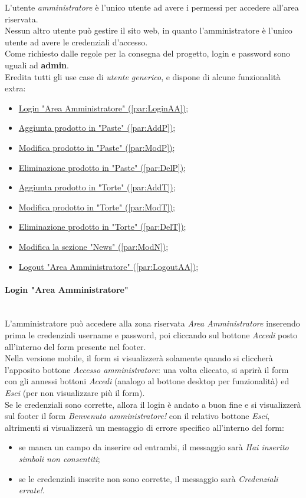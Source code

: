 L'utente \emph{amministratore} è l'unico utente ad avere i permessi per accedere all'area riservata.\\ 
Nessun altro utente può gestire il sito web, in quanto l'amministratore è l'unico utente ad avere le credenziali d'accesso.\\  
Come richiesto dalle regole per la consegna del progetto, login e password sono uguali ad \textbf{admin}.\\ 
Eredita tutti gli use case di \textit{utente generico}, e dispone di alcune funzionalità extra:
\begin{itemize}
	\item \hyperref[par:LoginAA]{ Login "Area Amministratore" (\ref{par:LoginAA})};
	\item \hyperref[par:AddP]{ Aggiunta prodotto in "Paste" (\ref{par:AddP})};
	\item \hyperref[par:ModP]{ Modifica prodotto in "Paste" (\ref{par:ModP})};
	\item \hyperref[par:DelP]{ Eliminazione prodotto in "Paste" (\ref{par:DelP})};
	\item \hyperref[par:AddT]{ Aggiunta prodotto in "Torte" (\ref{par:AddT})};
	\item \hyperref[par:ModT]{ Modifica prodotto in "Torte" (\ref{par:ModT})};
	\item \hyperref[par:DelT]{ Eliminazione prodotto in "Torte" (\ref{par:DelT})};
	\item \hyperref[par:ModN]{ Modifica la sezione "News" (\ref{par:ModN})};
	\item \hyperref[par:LogoutAA]{ Logout "Area Amministratore" (\ref{par:LogoutAA})};
\end{itemize}

\paragraph{Login "Area Amministratore"}\mbox{}\\
\label{par:LoginAA}
L'amministratore può accedere alla zona riservata \emph{Area Amministratore} inserendo prima le credenziali username e password, poi cliccando sul bottone \emph{Accedi} 
posto all'interno del form presente nel footer.\\ 
Nella versione mobile, il form si visualizzerà solamente quando si cliccherà l'apposito bottone \emph{Accesso amministratore}: una volta cliccato, si aprirà il form con 
gli annessi bottoni \emph{Accedi} (analogo al bottone desktop per funzionalità) ed \emph{Esci} (per non visualizzare più il form).\\ 
Se le credenziali sono corrette, allora il login è andato a buon fine e si visualizzerà sul footer il form \emph{Benvenuto amministratore!} con il relativo bottone \emph{Esci}, 
altrimenti si visualizzerà un messaggio di errore specifico all'interno del form:
\begin{itemize}
	\item se manca un campo da inserire od entrambi, il messaggio sarà \emph{Hai inserito simboli non consentiti};
	\item se le credenziali inserite non sono corrette, il messaggio sarà \emph{Credenziali errate!}.
\end{itemize}

